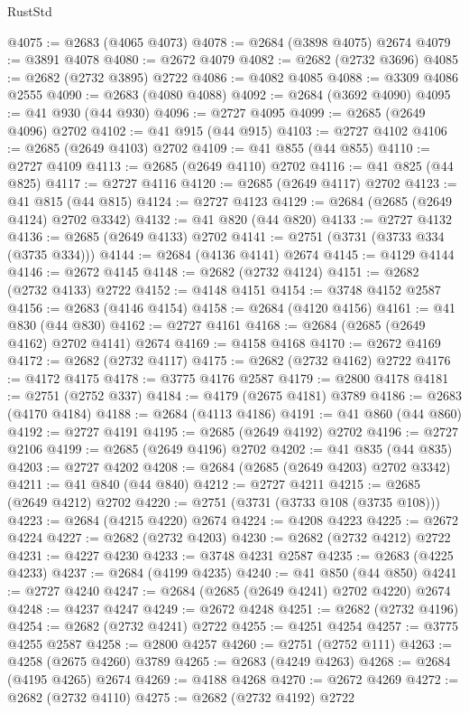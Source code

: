 \begin{lexlean}{RustStd}
\begin{coremodule}
@4075 := @2683 (@4065 @4073)
@4078 := @2684 (@3898 @4075) @2674
@4079 := @3891 @4078
@4080 := @2672 @4079
@4082 := @2682 (@2732 @3696)
@4085 := @2682 (@2732 @3895) @2722
@4086 := @4082 @4085
@4088 := @3309 @4086 @2555
@4090 := @2683 (@4080 @4088)
@4092 := @2684 (@3692 @4090)
@4095 := @41 @930 (@44 @930)
@4096 := @2727 @4095
@4099 := @2685 (@2649 @4096) @2702
@4102 := @41 @915 (@44 @915)
@4103 := @2727 @4102
@4106 := @2685 (@2649 @4103) @2702
@4109 := @41 @855 (@44 @855)
@4110 := @2727 @4109
@4113 := @2685 (@2649 @4110) @2702
@4116 := @41 @825 (@44 @825)
@4117 := @2727 @4116
@4120 := @2685 (@2649 @4117) @2702
@4123 := @41 @815 (@44 @815)
@4124 := @2727 @4123
@4129 := @2684 (@2685 (@2649 @4124) @2702 @3342)
@4132 := @41 @820 (@44 @820)
@4133 := @2727 @4132
@4136 := @2685 (@2649 @4133) @2702
@4141 := @2751 (@3731 (@3733 @334 (@3735 @334)))
@4144 := @2684 (@4136 @4141) @2674
@4145 := @4129 @4144
@4146 := @2672 @4145
@4148 := @2682 (@2732 @4124)
@4151 := @2682 (@2732 @4133) @2722
@4152 := @4148 @4151
@4154 := @3748 @4152 @2587
@4156 := @2683 (@4146 @4154)
@4158 := @2684 (@4120 @4156)
@4161 := @41 @830 (@44 @830)
@4162 := @2727 @4161
@4168 := @2684 (@2685 (@2649 @4162) @2702 @4141) @2674
@4169 := @4158 @4168
@4170 := @2672 @4169
@4172 := @2682 (@2732 @4117)
@4175 := @2682 (@2732 @4162) @2722
@4176 := @4172 @4175
@4178 := @3775 @4176 @2587
@4179 := @2800 @4178
@4181 := @2751 (@2752 @337)
@4184 := @4179 (@2675 @4181) @3789
@4186 := @2683 (@4170 @4184)
@4188 := @2684 (@4113 @4186)
@4191 := @41 @860 (@44 @860)
@4192 := @2727 @4191
@4195 := @2685 (@2649 @4192) @2702
@4196 := @2727 @2106
@4199 := @2685 (@2649 @4196) @2702
@4202 := @41 @835 (@44 @835)
@4203 := @2727 @4202
@4208 := @2684 (@2685 (@2649 @4203) @2702 @3342)
@4211 := @41 @840 (@44 @840)
@4212 := @2727 @4211
@4215 := @2685 (@2649 @4212) @2702
@4220 := @2751 (@3731 (@3733 @108 (@3735 @108)))
@4223 := @2684 (@4215 @4220) @2674
@4224 := @4208 @4223
@4225 := @2672 @4224
@4227 := @2682 (@2732 @4203)
@4230 := @2682 (@2732 @4212) @2722
@4231 := @4227 @4230
@4233 := @3748 @4231 @2587
@4235 := @2683 (@4225 @4233)
@4237 := @2684 (@4199 @4235)
@4240 := @41 @850 (@44 @850)
@4241 := @2727 @4240
@4247 := @2684 (@2685 (@2649 @4241) @2702 @4220) @2674
@4248 := @4237 @4247
@4249 := @2672 @4248
@4251 := @2682 (@2732 @4196)
@4254 := @2682 (@2732 @4241) @2722
@4255 := @4251 @4254
@4257 := @3775 @4255 @2587
@4258 := @2800 @4257
@4260 := @2751 (@2752 @111)
@4263 := @4258 (@2675 @4260) @3789
@4265 := @2683 (@4249 @4263)
@4268 := @2684 (@4195 @4265) @2674
@4269 := @4188 @4268
@4270 := @2672 @4269
@4272 := @2682 (@2732 @4110)
@4275 := @2682 (@2732 @4192) @2722

\end{coremodule}
\end{lexlean}

